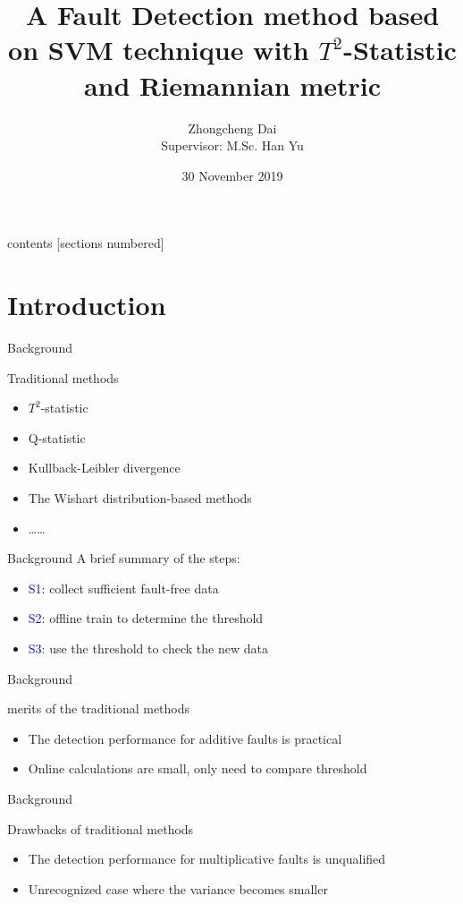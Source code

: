\documentclass[10pt]{beamer}
\title{A Fault Detection method based on SVM technique with $T^2$-Statistic and Riemannian metric}
\author{Zhongcheng Dai  \\
 Supervisor: M.Sc. Han Yu 
}
\date{30 November 2019}
\institute{Automatic Control and Complex Systems}
\begin{document}
\maketitle
\begin{frame}{contents}
  [sections numbered]
  \tableofcontents[hideallsubsections]
\end{frame}
\section{Introduction}
\begin{frame}{Background}
    \begin{exampleblock}{Traditional methods}
	\begin{itemize}
    \item $T^2$-statistic
    \item Q-statistic
    \item Kullback-Leibler divergence
    \item The Wishart distribution-based methods
    \item \dots \dots
    \end{itemize}
    \end{exampleblock}
\end{frame}
\begin{frame}{Background}
 A brief summary of the steps:
      \begin{itemize}
      \item \textcolor{blue}{S1}: collect sufficient fault-free data
      \item \textcolor{blue}{S2}: offline train to determine the threshold
      \item \textcolor{blue}{S3}: use the threshold to check the new data
 	 \end{itemize}  
\end{frame}
\begin{frame}{Background}
 \begin{exampleblock}{merits of the traditional methods}
	\begin{itemize}
    \item The detection performance for additive faults is practical
    \item Online calculations are small, only need to compare threshold
    \end{itemize}
    \end{exampleblock}
\end{frame}
\begin{frame}{Background}
\begin{exampleblock}{Drawbacks of traditional methods}
      \begin{itemize}
      \item The detection performance for multiplicative faults is unqualified
      \item Unrecognized case where the variance becomes smaller
 	 \end{itemize}  
 	 \end{exampleblock}
\end{frame}
\end{document}
